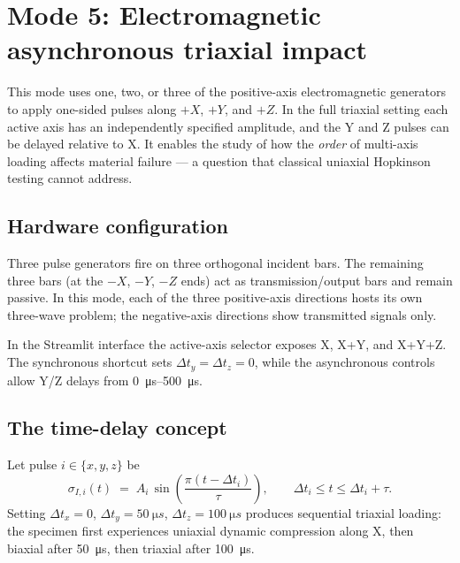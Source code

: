 \documentclass[11pt,a4paper,openany]{book}
\providecommand{\SI}[2]{\qty{#1}{#2}}
\providecommand{\SIrange}[3]{\qtyrange{#1}{#2}{#3}}
\theoremstyle{handbook}
\newcommand{\sig}{\sigma}
\begin{document}
\chapter{Mode 5: Electromagnetic asynchronous triaxial impact}\label{ch:mode5}

This mode uses one, two, or three of the positive-axis electromagnetic
generators to apply one-sided pulses along $+X$, $+Y$, and $+Z$. In the full
triaxial setting each active axis has an independently specified amplitude,
and the Y and Z pulses can be delayed relative to X. It enables the study of
how the \emph{order} of multi-axis loading affects material failure --- a
question that classical uniaxial Hopkinson testing cannot address.

\section{Hardware configuration}

Three pulse generators fire on three orthogonal incident bars. The remaining
three bars (at the $-X$, $-Y$, $-Z$ ends) act as transmission/output bars
and remain passive. In this mode, each of the three positive-axis directions
hosts its own three-wave problem; the negative-axis directions show
transmitted signals only.

In the Streamlit interface the active-axis selector exposes X, X+Y, and
X+Y+Z. The synchronous shortcut sets $\Delta t_y=\Delta t_z=0$, while the
asynchronous controls allow Y/Z delays from \SIrange{0}{500}{\micro s}.

\section{The time-delay concept}

Let pulse $i\in\{x,y,z\}$ be
\begin{equation}
  \sig_{I,i}(t) \;=\; A_i\,\sin\!\left(\frac{\pi(t-\Delta t_i)}{\tau}\right),
  \qquad \Delta t_i \le t \le \Delta t_i+\tau.
  \label{eq:async-pulse}
\end{equation}
Setting $\Delta t_x=0$, $\Delta t_y=\SI{50}{\micro s}$,
$\Delta t_z=\SI{100}{\micro s}$ produces sequential triaxial loading: the
specimen first experiences uniaxial dynamic compression along X, then
biaxial after \SI{50}{\micro s}, then triaxial after \SI{100}{\micro s}.
\end{document}
